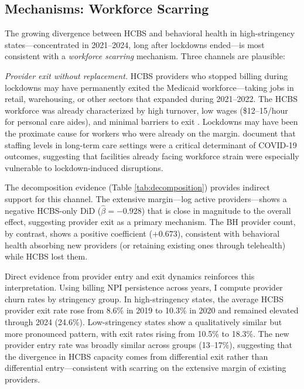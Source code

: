 \documentclass[12pt]{article}
\begin{document}
\subsection{Mechanisms: Workforce Scarring}

The growing divergence between HCBS and behavioral health in high-stringency states---concentrated in 2021--2024, long after lockdowns ended---is most consistent with a \textit{workforce scarring} mechanism. Three channels are plausible:

\textit{Provider exit without replacement.} HCBS providers who stopped billing during lockdowns may have permanently exited the Medicaid workforce---taking jobs in retail, warehousing, or other sectors that expanded during 2021--2022. The HCBS workforce was already characterized by high turnover, low wages (\$12--15/hour for personal care aides), and minimal barriers to exit \citep{scales2020, phiinc2021}. Lockdowns may have been the proximate cause for workers who were already on the margin. \citet{gorges2020staffing} document that staffing levels in long-term care settings were a critical determinant of COVID-19 outcomes, suggesting that facilities already facing workforce strain were especially vulnerable to lockdown-induced disruptions.

The decomposition evidence (Table \ref{tab:decomposition}) provides indirect support for this channel. The extensive margin---log active providers---shows a negative HCBS-only DiD ($\hat{\beta} = -0.928$) that is close in magnitude to the overall effect, suggesting provider exit as a primary mechanism. The BH provider count, by contrast, shows a positive coefficient ($+0.673$), consistent with behavioral health absorbing new providers (or retaining existing ones through telehealth) while HCBS lost them.

Direct evidence from provider entry and exit dynamics reinforces this interpretation. Using billing NPI persistence across years, I compute provider churn rates by stringency group. In high-stringency states, the average HCBS provider exit rate rose from 8.6\% in 2019 to 10.3\% in 2020 and remained elevated through 2024 (24.6\%). Low-stringency states show a qualitatively similar but more pronounced pattern, with exit rates rising from 10.5\% to 18.3\%. The new provider entry rate was broadly similar across groups (13--17\%), suggesting that the divergence in HCBS capacity comes from differential exit rather than differential entry---consistent with scarring on the extensive margin of existing providers.
\end{document}
